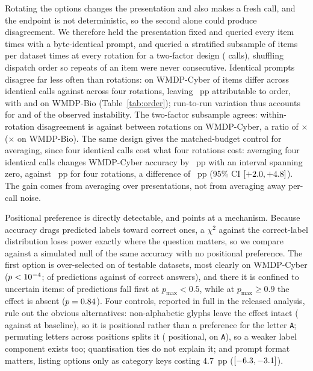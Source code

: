 \documentclass[conference]{IEEEtran}
\newcommand{\pmax}{p_{\max}}
\begin{document}
Rotating the options changes the presentation and also makes a fresh call, and the endpoint
is not deterministic, so the second alone could produce disagreement. We therefore held the
presentation fixed and queried every item \statReRepeats{} times with a byte-identical
prompt, and queried a stratified subsample of \statReFacItems{} items per dataset
\statReFacRepeats{} times at every rotation for a two-factor design (\statReCalls{} calls),
shuffling dispatch order so repeats of an item were never consecutive. Identical prompts
disagree far less often than rotations: on WMDP-Cyber \statReIdentCyber{} of items differ
across \statReRepeats{} identical calls against \statReRotCyber{} across four rotations,
leaving \statReGapCyber{}~pp attributable to order, with \statReIdentBio{} and
\statReRotBio{} on WMDP-Bio (Table~\ref{tab:order}); run-to-run variation thus accounts for
\statReNoiseShareCyber{} and \statReNoiseShareBio{} of the observed instability. The
two-factor subsample agrees: within-rotation disagreement is \statReWithinCyber{} against
\statReBetweenCyber{} between rotations on WMDP-Cyber, a ratio of
\statReRatioCyber{}$\times$ (\statReRatioBio{}$\times$ on WMDP-Bio). The same design gives
the matched-budget control for averaging, since four identical calls cost
what four rotations cost: averaging four identical calls changes WMDP-Cyber accuracy by
\statReGainIdentCyber{}~pp with an interval spanning zero, against
\statReGainRotCyber{}~pp for four rotations, a difference of \statReGainDiffCyber{}~pp
(95\% CI $[+2.0, +4.8]{}$). The gain comes from averaging over presentations, not
from averaging away per-call noise.

Positional preference is directly detectable, and points at a mechanism. Because accuracy
drags predicted labels toward correct ones, a $\chi^2$ against the correct-label
distribution loses power exactly where the question matters, so we compare against a
simulated null of the same accuracy with no positional preference. The first option is
over-selected on \statNSigPosDatasets{} of \statNTestedPosDatasets{} testable datasets,
most clearly on WMDP-Cyber ($p <10^{-4}{}$; \statPosPredACyber{} of predictions
against \statPosGoldACyber{} of correct answers), and there it is confined to uncertain
items: \statPosLowPredA{} of predictions fall first at $\pmax < 0.5$, while at
$\pmax \geq 0.9$ the effect is absent ($p = 0.84{}$). Four controls, reported in
full in the released analysis, rule out the obvious alternatives: non-alphabetic glyphs
leave the effect intact (\statAbSymCyber{} against \statAbBaseCyber{} at baseline), so it
is positional rather than a preference for the letter \texttt{A}; permuting letters across
positions splits it (\statAbShufPosCyber{} positional, \statAbShufLetterCyber{} on
\texttt{A}), so a weaker label component exists too; quantisation ties do not explain it;
and prompt format matters, listing options only as category keys costing 4.7~pp
($[-6.3, -3.1]{}$).
\end{document}
